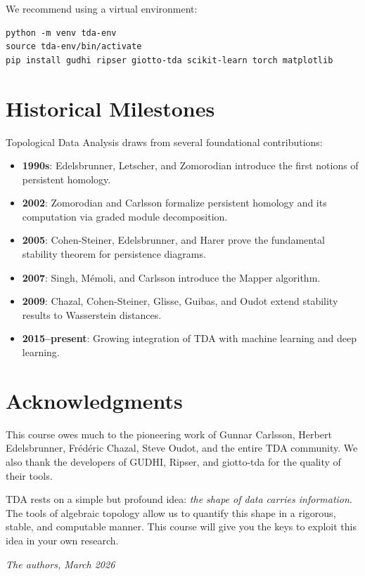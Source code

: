 \begin{warning}[title=\textbf{Recommended Installation}]
We recommend using a virtual environment:
\begin{verbatim}
python -m venv tda-env
source tda-env/bin/activate
pip install gudhi ripser giotto-tda scikit-learn torch matplotlib
\end{verbatim}
\end{warning}

\section*{Historical Milestones}

Topological Data Analysis draws from several foundational contributions:

\begin{itemize}
  \item \textbf{1990s}: Edelsbrunner, Letscher, and Zomorodian introduce
        the first notions of persistent homology.
  \item \textbf{2002}: Zomorodian and Carlsson formalize persistent
        homology and its computation via graded module decomposition.
  \item \textbf{2005}: Cohen-Steiner, Edelsbrunner, and Harer prove
        the fundamental stability theorem for persistence diagrams.
  \item \textbf{2007}: Singh, M\'emoli, and Carlsson introduce the
        Mapper algorithm.
  \item \textbf{2009}: Chazal, Cohen-Steiner, Glisse, Guibas, and Oudot
        extend stability results to Wasserstein distances.
  \item \textbf{2015--present}: Growing integration of TDA with machine
        learning and deep learning.
\end{itemize}

\section*{Acknowledgments}

This course owes much to the pioneering work of Gunnar Carlsson, Herbert
Edelsbrunner, Fr\'ed\'eric Chazal, Steve Oudot, and the entire TDA community.
We also thank the developers of GUDHI, Ripser, and giotto-tda for the
quality of their tools.

\begin{intuition}
TDA rests on a simple but profound idea: \emph{the shape of data carries
information}. The tools of algebraic topology allow us to quantify this
shape in a rigorous, stable, and computable manner. This course will give
you the keys to exploit this idea in your own research.
\end{intuition}

\bigskip
\hfill\textit{The authors, March 2026}
